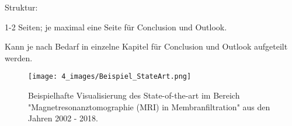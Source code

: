 \begin{enumerate}
\begin{compactitem}
\begin{compactitem}
        \end{compactitem}
        \item Struktur:
        \begin{compactitem}
            \item 1-2 Seiten; je maximal eine Seite für Conclusion und Outlook.
            \item Kann je nach Bedarf in einzelne Kapitel für Conclusion und Outlook aufgeteilt werden.
        \end{compactitem}
    \end{compactitem}
\end{enumerate}

\begin{figure}[h!bt]	%
		\begin{center}
		  \texttt{[image: 4\_images/Beispiel\_StateArt.png]}
		  \caption{Beispielhafte Visualisierung des State-of-the-art im Bereich "Magnetresonanztomographie (MRI) in Membranfiltration" aus den Jahren 2002 - 2018.}\label{fig:ChronologicStateOfTheArt}
		\end{center}
\end{figure}

